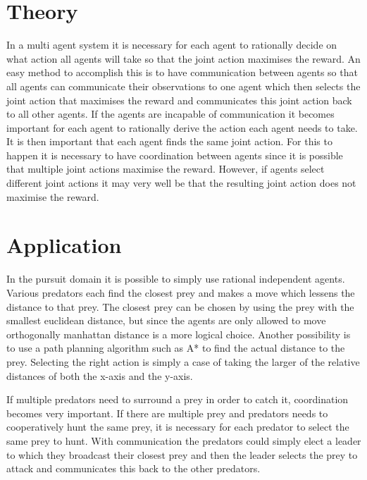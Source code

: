 \documentclass[10pt]{article}
\begin{document}
\section{Theory}\label{theory}
In a multi agent system it is necessary for each agent to rationally decide on what action all agents will take so that the joint action maximises the reward. An easy method to accomplish this is to have communication between agents so that all agents can communicate their observations to one agent which then selects the joint action that maximises the reward and communicates this joint action back to all other agents. If the agents are incapable of communication it becomes important for each agent to rationally derive the action each agent needs to take. It is then important that each agent finds the same joint action. For this to happen it is necessary to have coordination between agents\cite{Vlassis} since it is possible that multiple joint actions maximise the reward. However, if agents select different joint actions it may very well be that the resulting joint action does not maximise the reward.




\section{Application}\label{application}
In the pursuit domain it is possible to simply use rational independent agents. Various predators each find the closest prey and makes a move which lessens the distance to that prey. The closest prey can be chosen by using the prey with the smallest euclidean distance, but since the agents are only allowed to move orthogonally manhattan distance is a more logical choice. Another possibility is to use a path planning algorithm such as A* to find the actual distance to the prey. Selecting the right action is simply a case of taking the larger of the relative distances of both the x-axis and the y-axis.

If multiple predators need to surround a prey in order to catch it, coordination becomes very important. If there are multiple prey and predators needs to cooperatively hunt the same prey, it is necessary for each predator to select the same prey to hunt. With communication the predators could simply elect a leader to which they broadcast their closest prey and then the leader selects the prey to attack and communicates this back to the other predators.
\end{document}
